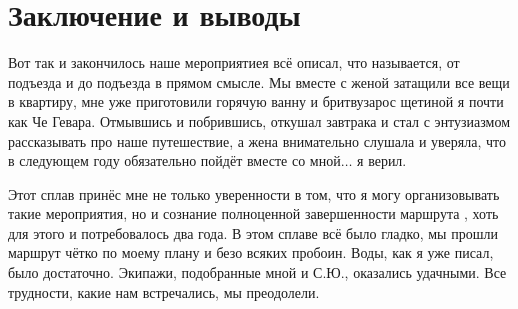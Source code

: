 \chapter{Заключение и выводы} 

Вот так и закончилось наше мероприятие\mdash я всё описал, что называется, от подъезда и до подъезда в прямом смысле. Мы вместе с женой затащили все вещи в квартиру, мне уже приготовили горячую ванну и бритву\mdash зарос щетиной я почти как Че Гевара. Отмывшись и побрившись, откушал завтрака и стал с энтузиазмом рассказывать про наше путешествие, а жена внимательно слушала и уверяла, что в следующем году обязательно пойдёт вместе со мной$\ldots$ я верил.

Этот сплав принёс мне не только уверенности в том, что я могу организовывать такие мероприятия, но и сознание полноценной завершенности маршрута , хоть для этого и потребовалось два года. В этом сплаве всё было гладко, мы прошли маршрут чётко по моему плану и безо всяких пробоин. Воды, как я уже писал, было достаточно. Экипажи, подобранные мной и С.Ю., оказались удачными. Все трудности, какие нам встречались, мы преодолели.

